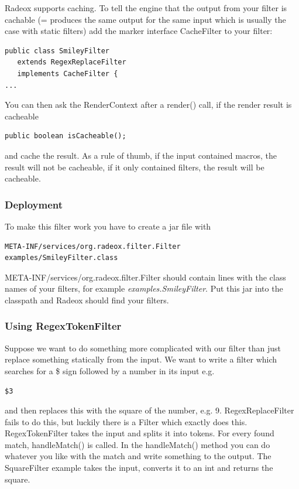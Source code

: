 \documentclass[a4paper,pdftex]{article}
\begin{document}
Radeox supports caching. To tell the engine that the output from your filter is cachable (= produces the same
output for the same input which is usually the case with static filters) add the marker interface CacheFilter
to your filter:

\begin{verbatim}
public class SmileyFilter
   extends RegexReplaceFilter 
   implements CacheFilter {
...
\end{verbatim}

You can then ask the RenderContext after a render() call, if the render result is cacheable

\begin{verbatim}
public boolean isCacheable();
\end{verbatim}

and cache the result. As a rule of thumb, if the input contained macros, the result will not be cacheable,
if it only contained filters, the result will be cacheable.

\subsubsection{Deployment}

To make this filter work you have to create a jar file with

\begin{verbatim}
META-INF/services/org.radeox.filter.Filter
examples/SmileyFilter.class
\end{verbatim}

META-INF/services/org.radeox.filter.Filter should contain lines with the class names of your filters, for example
\textit{examples.SmileyFilter}. Put this jar into the classpath and Radeox should find your filters.

\subsubsection{Using RegexTokenFilter}

Suppose we want to do something more complicated with our filter than just replace
something statically from the input. We want to write a filter which searches
for a \$ sign followed by a number in its input e.g.

\begin{verbatim}
$3
\end{verbatim}

and then replaces this with the square of the number, e.g. 9. RegexReplaceFilter fails
to do this, but luckily there is a Filter which exactly does this. RegexTokenFilter 
takes the input and splits it into tokens. For every found match, handleMatch() is called.
In the handleMatch() method you can do whatever you like with the match and
write something to the output. The SquareFilter example takes the input, converts
it to an int and returns the square.
\end{document}
